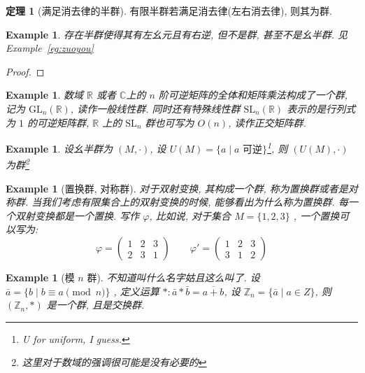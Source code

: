 \documentclass[12pt]{ctexart}
\theoremstyle{definition}
\theoremstyle{definition}
\newtheorem{thm}[definition]{定理}
\theoremstyle{plain}
\newtheorem{exam}[definition]{Example}
\theoremstyle{remark}
\begin{document}
\begin{thm}[满足消去律的半群] 
有限半群若满足消去律(左右消去律), 则其为群.
\end{thm}

\begin{exam}
	存在半群使得其有左幺元且有右逆, 但不是群, 甚至不是幺半群. 见Example~\ref{eg:zuoyou}
\end{exam}
\begin{proof}
\end{proof}

\begin{exam}
	数域 \(\mathbb{R}\) 或者 \(\mathbb{C}\)上的 \(n\) 阶可逆矩阵的全体和矩阵乘法构成了一个群, 记为 \(\text{GL}_{n} (\mathbb{R})\), 读作一般线性群. 同时还有特殊线性群 \(\text{SL}_{n} (\mathbb{R})\) 表示的是行列式为 \(1\) 的可逆矩阵群, \(\mathbb{R}\) 上的 \(\text{SL} _{n}\) 群也可写为 \(O(n)\), 读作正交矩阵群. 
\end{exam}
\begin{exam}
	设幺半群为 \( (M , \cdot )\), 设 \(U (M) = \{ a \mid a \text{ 可逆}\}\)\footnote{U for uniform, I guess.}, 则 \(( U (M), \cdot)\) 为群\footnote{这里对于数域的强调很可能是没有必要的}
\end{exam}
\begin{exam}[置换群, 对称群]\label{eg:sym}
	对于双射变换, 其构成一个群, 称为置换群或者是对称群. 当我们考虑有限集合上的双射变换的时候, 能够看出为什么称为置换群. 每一个双射变换都是一个置换. 写作 \(\varphi\), 比如说, 对于集合 \(M = \{ 1, 2 ,3 \}\) , 一个置换可以写为: 
	\begin{equation}
	\varphi = 
	\begin{pmatrix}
		1 & 2 & 3 \\ 
		2 & 3 & 1 
	\end{pmatrix}
	\qquad \varphi' = 
	\begin{pmatrix}
		1 & 2 & 3 \\ 
		3 & 1 & 2 
	\end{pmatrix}
	\end{equation}
\end{exam}

\begin{exam}[模 \(n\) 群]\label{eg:modn}
	不知道叫什么名字姑且这么叫了. 
	设 \(\bar a = \{ b \mid b \equiv a \pmod{n}\}\) , 定义运算 \(* \colon \bar a * \bar b = \overline{a + b}\), 设 \(\mathbb{Z} _{n} = \{\bar a \mid a \in Z \}\), 则 \((\mathbb{Z}_{n} , *)\) 是一个群, 且是交换群. 
\end{exam}
\end{document}
